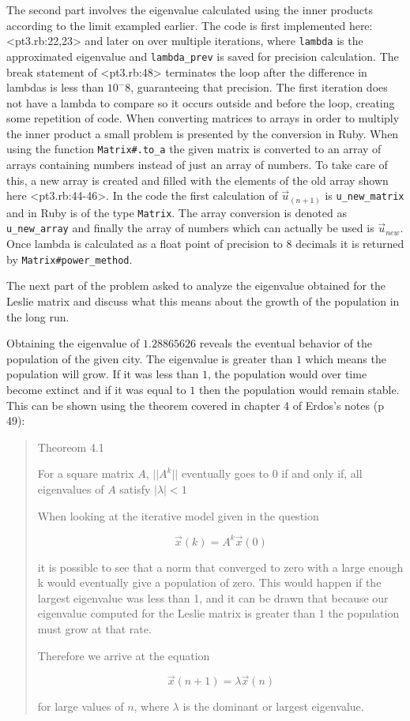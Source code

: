 \documentclass[letterpaper,11pt]{article}
\begin{document}
The second part involves the eigenvalue calculated using the inner products according
to the limit exampled earlier.
The code is first implemented here: <pt3.rb:22,23> and later on over multiple iterations,
where \texttt{lambda} is the approximated eigenvalue and \texttt{lambda\_prev} is saved for precision calculation.
The break statement of <pt3.rb:48> terminates the loop after the difference in lambdas is less
than $10^-8$, guaranteeing that precision.
The first iteration does not have a lambda to compare so it occurs outside and before the loop,
creating some repetition of code. When converting matrices to arrays in order to multiply the
inner product a small problem is presented by the conversion in Ruby.
When using the function \texttt{Matrix\#.to\_a} the given matrix is converted to an array of arrays
containing numbers instead of just an array of numbers.
To take care of this, a new array is created and filled with the elements of the old array shown
here <pt3.rb:44-46>.
In the code the first calculation of $\vec{u}_{(n+1)}$ is \texttt{u\_new\_matrix} and in Ruby is of
the type \texttt{Matrix}.
The array conversion is denoted as \texttt{u\_new\_array} and finally the array of numbers which
can actually be used is $\vec{u}_{new}$.
Once lambda is calculated as a float point of precision to 8 decimals it is returned by 
\texttt{Matrix\#power\_method}.

The next part of the problem asked to analyze the eigenvalue obtained for the Leslie matrix and
discuss what this means about the growth of the population in the long run.

Obtaining the eigenvalue of $1.28865626$ reveals the eventual behavior of the population of the given city.
The eigenvalue is greater than $1$ which means the population will grow.
If it was less than $1$, the population would over time become extinct and if it was equal to $1$ then the
population would remain stable.
This can be shown using the theorem covered in chapter 4 of Erdos's notes (p 49):

\begin{quote}
Theoreom 4.1

For a square matrix $A$,
$||A^k||$ eventually goes to $0$ if and only if, all eigenvalues of $A$ satisfy $|\lambda| < 1$

When looking at the iterative model given in the question 

\[\vec{x}(k) = A^k \vec{x}(0)\]

it is possible to see that a norm that converged to zero with a large enough k would eventually give a population of zero.
This would happen if the largest eigenvalue was less than 1, and it can be drawn that because our eigenvalue computed for
the Leslie matrix is greater than 1 the population must grow at that rate.

Therefore we arrive at the equation

\[\vec{x}(n+1) = \lambda\vec{x}(n)\]

for large values of $n$, where $\lambda$ is the dominant or largest eigenvalue.
\end{quote}
\end{document}
